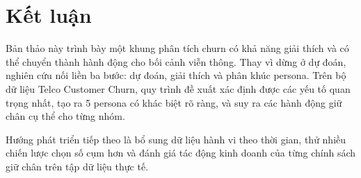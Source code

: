 ﻿\documentclass[conference]{IEEEtran}
\begin{document}
\section{Kết luận}
Bản thảo này trình bày một khung phân tích churn có khả năng giải thích và có thể chuyển thành hành động cho bối cảnh viễn thông. Thay vì dừng ở dự đoán, nghiên cứu nối liền ba bước: dự đoán, giải thích và phân khúc persona. Trên bộ dữ liệu Telco Customer Churn, quy trình đề xuất xác định được các yếu tố quan trọng nhất, tạo ra 5 persona có khác biệt rõ ràng, và suy ra các hành động giữ chân cụ thể cho từng nhóm.

Hướng phát triển tiếp theo là bổ sung dữ liệu hành vi theo thời gian, thử nhiều chiến lược chọn số cụm hơn và đánh giá tác động kinh doanh của từng chính sách giữ chân trên tập dữ liệu thực tế.

\balance



\end{document}
